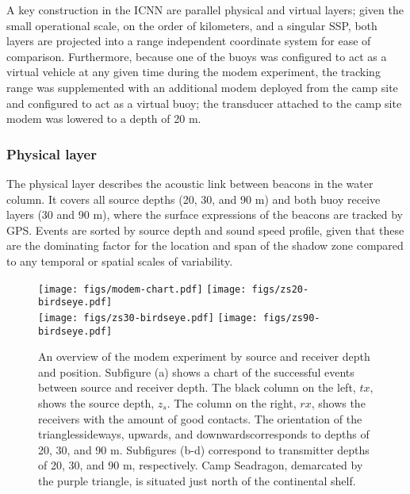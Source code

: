 A key construction in the ICNN are parallel physical and virtual layers; given the small operational scale, on the order of kilometers, and a singular SSP, both layers are projected into a range independent coordinate system for ease of comparison. Furthermore, because one of the buoys was configured to act as a virtual vehicle at any given time during the modem experiment, the tracking range was supplemented with an additional modem deployed from the camp site and configured to act as a virtual buoy; the transducer attached to the camp site modem was lowered to a depth of 20 m.


\subsubsection{Physical layer}
The physical layer describes the acoustic link between beacons in the water column.
It covers all source depths (20, 30, and 90 m) and both buoy receive layers (30 and 90 m), where the surface expressions of the beacons are tracked by GPS.
Events are sorted by source depth and sound speed profile, given that these are the dominating factor for the location and span of the shadow zone compared to any temporal or spatial scales of variability.


\begin{figure}[h!]
  \centering
  \texttt{[image: figs/modem-chart.pdf]} \hfill
  \texttt{[image: figs/zs20-birdseye.pdf]} \\
  \vspace{1em}
  \texttt{[image: figs/zs30-birdseye.pdf]} \hfill
  \texttt{[image: figs/zs90-birdseye.pdf]} \\
  \caption{An overview of the modem experiment by source and receiver depth and position. Subfigure (a) shows a chart of the successful events between source and receiver depth. The black column on the left, $tx$, shows the source depth, $z_s$. The column on the right, $rx$, shows the receivers with the amount of good contacts. The orientation of the triangles\textemdash sideways, upwards, and downwards\textemdash corresponds to depths of 20, 30, and 90 m. Subfigures (b-d) correspond to transmitter depths of 20, 30, and 90 m, respectively. Camp Seadragon, demarcated by the purple triangle, is situated just north of the continental shelf.}
  \label{fig:overview}
  \end{figure}

\clearpage

